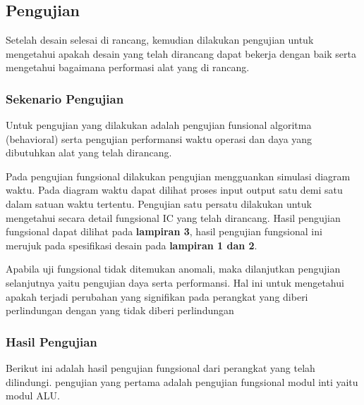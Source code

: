 % 

\chapter{\babEmpat}

% 

\section{Pengujian}
Setelah desain selesai di rancang, kemudian dilakukan pengujian untuk mengetahui apakah desain yang telah dirancang dapat bekerja dengan baik serta mengetahui bagaimana performasi alat yang di rancang.

\subsection{Sekenario Pengujian}
Untuk pengujian yang dilakukan adalah pengujian funsional algoritma (behavioral) serta pengujian performansi waktu operasi dan daya yang dibutuhkan alat yang telah dirancang.

Pada pengujian fungsional dilakukan pengujian mengguankan simulasi diagram waktu. Pada diagram waktu dapat dilihat proses input output satu demi satu dalam satuan waktu tertentu. Pengujian satu persatu dilakukan untuk mengetahui secara detail fungsional IC yang telah dirancang. Hasil pengujian fungsional dapat dilihat pada \textbf{lampiran 3}, hasil pengujian fungsional ini merujuk pada spesifikasi desain pada \textbf{lampiran 1 dan 2}.

Apabila uji fungsional tidak ditemukan anomali, maka dilanjutkan pengujian selanjutnya yaitu pengujian daya serta performansi. Hal ini untuk mengetahui apakah terjadi perubahan yang signifikan pada perangkat yang diberi perlindungan dengan yang tidak diberi perlindungan

\subsection{Hasil Pengujian}
Berikut ini adalah hasil pengujian fungsional dari perangkat yang telah dilindungi. pengujian yang pertama adalah pengujian fungsional  modul inti yaitu modul ALU.

